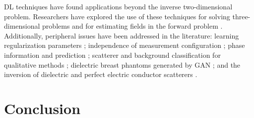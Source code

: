 		DL techniques have found applications beyond the inverse two-dimensional problem. Researchers have explored the use of these techniques for solving three-dimensional problems \citep{chen2023mesh,han2022hybrid,khoshdel2021multi,zhou2021improved,xiao2022hybrid,zhao2022machine} and for estimating fields in the forward problem \citep{guo2022physics,ma2021learning,seretis2022toward,yao2023implementing,yin2022electric,hu2022theory}. Additionally, peripheral issues have been addressed in the literature: learning regularization parameters \citep{afkham2021learning}; independence of measurement configuration \citep{li2023transceiver}; phase information \citep{pan2021phase} and prediction \citep{luo2022cascaded}; scatterer and background classification for qualitative methods \citep{ruiz2022physics}; dielectric breast phantoms generated by GAN \citep{shao2022dielectric}; and the inversion of dielectric and perfect electric conductor scatterers \citep{song2022learning}.

	\section{Conclusion}\label{chap:methods:conclusion}
		
